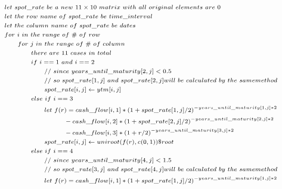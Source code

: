 \documentclass[10pt]{article}
\begin{document}
\begin{enumerate}
\begin{enumerate}
            $$
            \begin{scriptsize}
            \begin{aligned}
            & let \ spot\_rate \ be \ a \ new \ 11 \times 10 \ matrix \ with \ all \ original \ elements \ are \ 0 \\
            & let \ the \ row \ name \ of \ spot\_rate \ be \ time\_interval \\
            & let \ the \ column \ name \ of \ spot\_rate \ be \ dates \\
            & for \ i \ in \ the \ range \ of \ \# \ of \ row \\
            & \qquad for \ j \ in \ the \ range \ of \ \# \ of \ column \\
            & \qquad \qquad there \ are \ 11 \ cases \ in \ total \\
            & \qquad \qquad if \ i == 1 \ and \ i == 2 \\
            & \qquad \qquad \qquad // \ since \  years\_until\_maturity[2,j] < 0.5 \\
            & \qquad \qquad \qquad // \ so \ spot\_rate[1,j] \ and \ spot\_rate[2,j] will \ be \ calculated \ by \ the \ same method \\
            & \qquad \qquad \qquad spot\_rate[i,j] \leftarrow ytm[i,j] \\
            & \qquad \qquad else \ if \ i == 3 \\
            & \qquad \qquad \qquad let \ f(r) = cash\_flow[i,1]*(1 + spot\_rate[1, j]/2)^{-years\_until\_maturity[1,j]*2} \\
            & \qquad \qquad \qquad \qquad \quad - cash\_flow[i,2]*(1 + spot\_rate[2,j]/2)^{-years\_until\_maturity[2,j]*2} \\
            & \qquad \qquad \qquad \qquad \quad -cash\_flow[i,3]*(1 + r/2)^{- years\_until\_maturity[3,j] * 2} \\
            & \qquad \qquad \qquad spot\_rate[i,j] \leftarrow uniroot(f(r), c(0,1))\$root \\
            & \qquad \qquad else \ if \ i == 4 \\
            & \qquad \qquad \qquad // \ since \  years\_until\_maturity[4,j] < 1.5 \\
            & \qquad \qquad \qquad // \ so \ spot\_rate[3,j] \ and \ spot\_rate[4,j] will \ be \ calculated \ by \ the \ same method \\
            & \qquad \qquad \qquad let \ f(r) = cash\_flow[i,1]*(1 + spot\_rate[1, j]/2)^{-years\_until\_maturity[1,j]*2} \\

\end{aligned}
\end{scriptsize}$$
\end{enumerate}
\end{enumerate}
\end{document}
